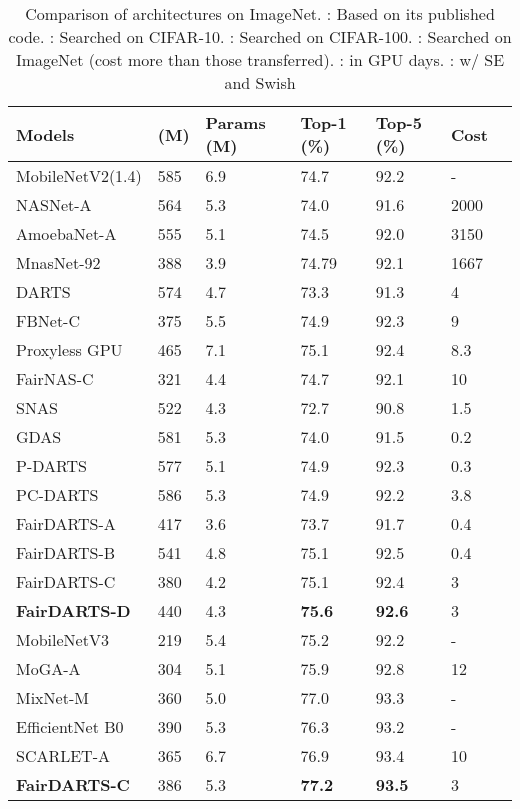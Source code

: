 \documentclass[runningheads]{llncs}
\begin{document}
\setlength{\tabcolsep}{4pt}
\begin{table}
	\begin{center}
	\caption{Comparison of architectures on ImageNet. : Based on its published code. : Searched on CIFAR-10. : Searched on CIFAR-100. : Searched on ImageNet (cost more than those transferred). : in GPU days. : w/ SE and Swish} 
	\label{tab:comparison-imagenet}
	  \begin{footnotesize}
		\begin{tabular}{*{7}{l}} 			
		\hline\noalign{\smallskip}
			Models &  (M)  &Params (M) & Top-1 (\%) & Top-5 (\%) & Cost \\
\hline\noalign{\smallskip} 
			MobileNetV2(1.4) \cite{sandler2018mobilenetv2}   & 585 & 6.9 & 74.7 & 92.2 &-\\
			\hline\noalign{\smallskip}
			NASNet-A \cite{zoph2017learning}  & 564 & 5.3 &74.0 & 91.6& 2000\\
			AmoebaNet-A\cite{real2018regularized} & 555  & 5.1 & 74.5 &92.0& 3150 \\
                       MnasNet-92 \cite{tan2018mnasnet}  & 388 & 3.9 & 74.79 & 92.1 & 1667\\ 	
\hline\noalign{\smallskip}
			DARTS \cite{liu2018darts} & 574 & 4.7 & 73.3 & 91.3& 4\\
FBNet-C \cite{wu2018fbnet}   & 375 & 5.5 &  74.9 & 92.3 & 9 \\ 
Proxyless GPU \cite{cai2018proxylessnas}  & 465 & 7.1  & 75.1 & 92.4 & 8.3\\
			FairNAS-C \cite{chu2019fairnas} &321 & 4.4 & 74.7 &92.1 & 10 \\
			SNAS \cite{xie2018snas}  &522&4.3&72.7&90.8 & 1.5\\
			GDAS \cite{dong2019searching}  &581&5.3&74.0&91.5 & 0.2\\
			P-DARTS\cite{chen2019progressive}& 577 & 5.1 & 74.9 & 92.3 & 0.3 \\  PC-DARTS \cite{xu2019pc} & 586 & 5.3 & 74.9 & 92.2& 3.8\\ 
			FairDARTS-A & 417 & 3.6 &73.7 & 91.7& 0.4 \\
		        FairDARTS-B & 541 & 4.8 &75.1 & 92.5& 0.4 \\
			FairDARTS-C & 380 &4.2 &75.1 & 92.4 &3\\
			\textbf{FairDARTS-D} & 440 & 4.3 & \textbf{75.6} & \textbf{92.6}&3 \\
			\hline\noalign{\smallskip}
			MobileNetV3 \cite{howard2019searching} & 219 & 5.4 &75.2 & 92.2 & -\\
			MoGA-A \cite{chu2019moga} & 304 & 5.1 & 75.9 & 92.8 & 12 \\
			MixNet-M \cite{tan2020mixconv} &360 & 5.0 & 77.0 & 93.3& -\\
			EfficientNet B0 \cite{tan2019efficientnet} &390 & 5.3  & 76.3 & 93.2 & - \\
			SCARLET-A \cite{chu2019scarletnas} & 365 & 6.7 &   76.9 &93.4 & 10 \\
			\textbf{FairDARTS-C} & 386 & 5.3 & \textbf{77.2} & \textbf{93.5} & 3 \\



\end{tabular}
\end{footnotesize}
\end{center}
\end{table}
\end{document}
